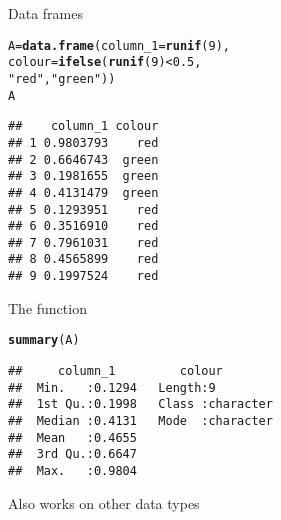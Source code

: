 \documentclass[aspectratio=169]{beamer}\usepackage[]{graphicx}\usepackage[]{xcolor}
\makeatletter
\newcommand{\hlnum}[1]{\textcolor[rgb]{0.686,0.059,0.569}{#1}}%
\newcommand{\hlsng}[1]{\textcolor[rgb]{0.192,0.494,0.8}{#1}}%
\newcommand{\hlopt}[1]{\textcolor[rgb]{0,0,0}{#1}}%
\newcommand{\hldef}[1]{\textcolor[rgb]{0.345,0.345,0.345}{#1}}%
\newcommand{\hlkwb}[1]{\textcolor[rgb]{0.69,0.353,0.396}{#1}}%
\newcommand{\hlkwc}[1]{\textcolor[rgb]{0.333,0.667,0.333}{#1}}%
\newcommand{\hlkwd}[1]{\textcolor[rgb]{0.737,0.353,0.396}{\textbf{#1}}}%
\newenvironment{kframe}{%
 \def\at@end@of@kframe{}%
 \ifinner\ifhmode%
  \def\at@end@of@kframe{\end{minipage}}%
  \begin{minipage}{\columnwidth}%
 \fi\fi%
 \def\FrameCommand##1{\hskip\@totalleftmargin \hskip-\fboxsep
 \colorbox{shadecolor}{##1}\hskip-\fboxsep
     \hskip-\linewidth \hskip-\@totalleftmargin \hskip\columnwidth}%
 \MakeFramed {\advance\hsize-\width
   \@totalleftmargin\z@ \linewidth\hsize
   \@setminipage}}%
 {\par\unskip\endMakeFramed%
 \at@end@of@kframe}
\newenvironment{knitrout}{}{} %
\makeatother
\begin{document}
\begin{frame}[fragile]{Data frames}
\begin{knitrout}
\color{fgcolor}\begin{kframe}
\begin{alltt}
\hldef{A} \hlkwb{=} \hlkwd{data.frame}\hldef{(}\hlkwc{column_1} \hldef{=} \hlkwd{runif}\hldef{(}\hlnum{9}\hldef{),}
               \hlkwc{colour} \hldef{=} \hlkwd{ifelse}\hldef{(}\hlkwd{runif}\hldef{(}\hlnum{9}\hldef{)} \hlopt{<} \hlnum{0.5}\hldef{,}
                               \hlsng{"red"}\hldef{,} \hlsng{"green"}\hldef{))}
\hldef{A}
\end{alltt}
\begin{verbatim}
##    column_1 colour
## 1 0.9803793    red
## 2 0.6646743  green
## 3 0.1981655  green
## 4 0.4131479  green
## 5 0.1293951    red
## 6 0.3516910    red
## 7 0.7961031    red
## 8 0.4565899    red
## 9 0.1997524    red
\end{verbatim}
\end{kframe}
\end{knitrout}
\end{frame}
  
\begin{frame}[fragile]{The  function}
\begin{knitrout}
\color{fgcolor}\begin{kframe}
\begin{alltt}
\hlkwd{summary}\hldef{(A)}
\end{alltt}
\begin{verbatim}
##     column_1         colour         
##  Min.   :0.1294   Length:9          
##  1st Qu.:0.1998   Class :character  
##  Median :0.4131   Mode  :character  
##  Mean   :0.4655                     
##  3rd Qu.:0.6647                     
##  Max.   :0.9804
\end{verbatim}
\end{kframe}
\end{knitrout}
\vfill
Also works on other data types
\end{frame}
\end{document}
